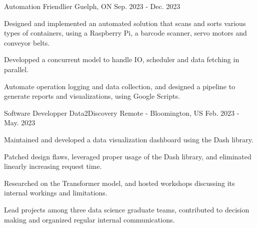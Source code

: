 

\begin{cventries}
\cventry
{Automation} %
{Friendlier} %
{Guelph, ON} %
{Sep. 2023 - Dec. 2023} %
{
  \begin{cvitems} %
    \item {Designed and implemented an automated solution that scans and sorts various types of containers, using a Raspberry Pi, a barcode scanner, servo motors and conveyor belts.}
    \item {Developped a concurrent model to handle IO, scheduler and data fetching in parallel.}
    \item {Automate operation logging and data collection, and designed a pipeline to generate reports and visualizations, using Google Scripts.}
  \end{cvitems}
}

  \cventry
    {Software Developper} %
    {Data2Discovery} %
    {Remote - Bloomington, US} %
    {Feb. 2023 - May. 2023} %
    {
      \begin{cvitems} %
        \item {Maintained and developed a data visualization dashboard using the Dash library.}
        \item {Patched design flaws, leveraged proper usage of the Dash library, and eliminated linearly increasing request time.}
        \item {Researched on the Transformer model, and hosted workshops discussing its internal workings and limitations.}
        \item {Lead projects among three data science graduate teams, contributed to decision making and organized regular internal communications.}
      \end{cvitems}
    }

\end{cventries}
